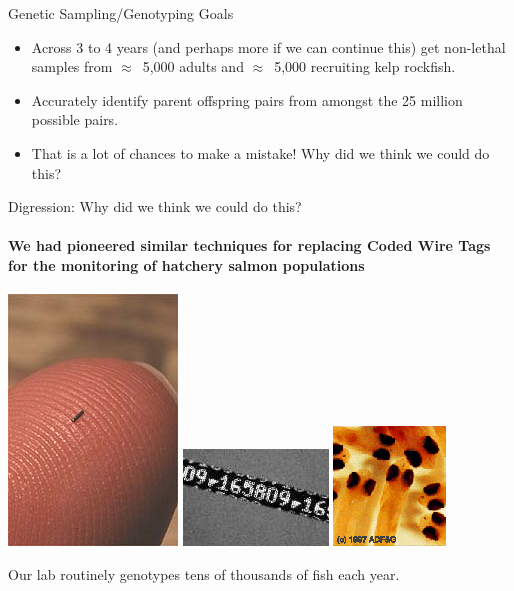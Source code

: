 \documentclass[letter,graphicx]{beamer}
\begin{document}
\begin{frame}{Genetic Sampling/Genotyping Goals}
\begin{itemize}
\item Across 3 to 4 years (and perhaps more if we can continue this) get non-lethal samples from $\approx$~5,000 adults and $\approx$~5,000 recruiting kelp rockfish. 
\item Accurately identify parent offspring pairs from amongst the 25 million possible pairs.
\item That is a lot of chances to make a mistake!  Why did we think we could do this?
\end{itemize}
\end{frame}






\begin{frame}{Digression: Why did we think we could do this?}
\framesubtitle{We had pioneered similar techniques for replacing Coded Wire Tags 
for the monitoring of hatchery salmon populations}
\begin{center}
\mbox{}
\hfill
\includegraphics[height=.33\textwidth]{./figs/finger.jpg}
\hfill
\includegraphics[height=.2\textwidth]{./figs/cwt.png}
\hfill
\includegraphics[height=.25\textwidth]{./figs/pink.png}
\hfill
\mbox{}
\end{center}
Our lab routinely genotypes tens of thousands of fish each year.
\end{frame}
\end{document}
